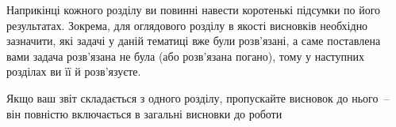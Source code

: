 \chapconclude{\ref{chap:review}}

Наприкінці кожного розділу ви повинні навести коротенькі підсумки по його
результатах. Зокрема, для оглядового розділу в якості висновків необхідно
зазначити, які задачі у даній тематиці вже були розв'язані, а саме
поставлена вами задача розв'язана не була (або розв'язана погано), тому у
наступних розділах ви її й розв'язуєте.

Якщо ваш звіт складається з одного розділу, пропускайте висновок до
нього~-- він повністю включається в загальні висновки до роботи
